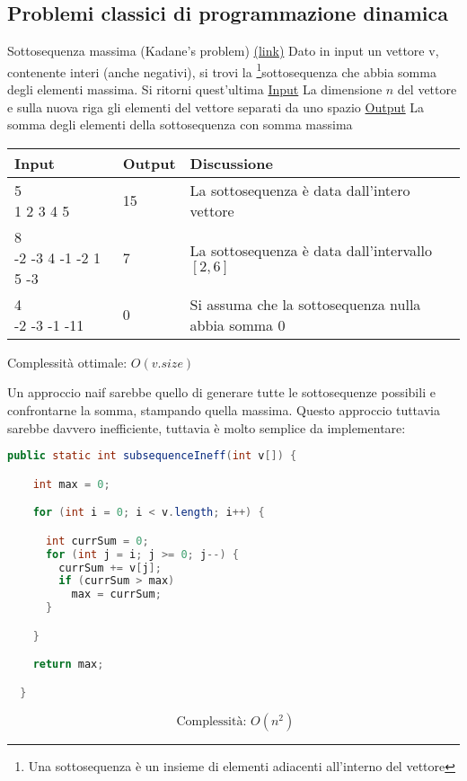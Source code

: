 \subsection{Problemi classici di programmazione dinamica}
\begin{esercizio}{Sottosequenza massima (Kadane's problem) \href{https://leetcode.com/problems/maximum-subarray}{(link)} }
	Dato in input un vettore {\ttfamily v}, contenente interi (anche negativi), si trovi la \footnote{Una sottosequenza è un insieme di elementi adiacenti all'interno del vettore}{sottosequenza} che abbia somma degli elementi massima. Si ritorni quest'ultima
	\vskip3mm
	\vskip3mm
	\underline{Input}
	\vskip3mm
	La dimensione $ n $ del vettore e sulla nuova riga gli elementi del vettore separati da uno spazio
	\vskip3mm
	\underline{Output}
	\vskip3mm
	La somma degli elementi della sottosequenza con somma massima
	\renewcommand{\cellalign}{l}
	\begin{center}
		\begin{tabularx}{\textwidth}{llX}
			\toprule
			Input & Output & Discussione \\
			\midrule
			\makecell{5                  \\ 1 2 3 4 5} & 15 & La sottosequenza è data dall'intero vettore \\
			\makecell{8                  \\ -2 -3 4 -1 -2 1 5 -3} & 7 & La sottosequenza è data dall'intervallo $ \left[2, 6\right] $ \\
			\makecell{4                  \\ -2 -3 -1 -11 } & 0 & Si assuma che la sottosequenza nulla abbia somma 0  \\
			\bottomrule
		\end{tabularx}
	\end{center}
	Complessità ottimale: $ O\left(v.size\right) $
\end{esercizio}
\vskip3mm

Un approccio naif sarebbe quello di generare tutte le sottosequenze possibili e confrontarne la somma, stampando quella massima. Questo approccio tuttavia sarebbe davvero inefficiente, tuttavia è molto semplice da implementare:
\begin{lstlisting}[language = java, frame = none]
    public static int subsequenceIneff(int v[]) {

    int max = 0;

    for (int i = 0; i < v.length; i++) {

      int currSum = 0;
      for (int j = i; j >= 0; j--) {
        currSum += v[j];
        if (currSum > max)
          max = currSum;
      }

    }

    return max;

  }
\end{lstlisting}
\[
	\text{ Complessità: } O\left(n^2 \right)
\]

